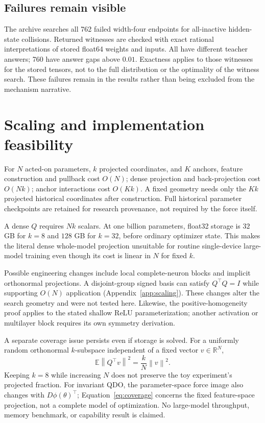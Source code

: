 \documentclass[11pt,letterpaper]{article}
\theoremstyle{remark}\newtheorem{remark}{Remark}
\newcommand{\R}{\mathbb R}
\newcommand{\E}{\mathbb E}
\newcommand{\norm}[1]{\left\lVert#1\right\rVert}
\begin{document}
\subsection{Failures remain visible}
The archive searches all 762 failed width-four endpoints for all-inactive hidden-state collisions. Returned witnesses are checked with exact rational interpretations of stored float64 weights and inputs. All have different teacher answers; 760 have answer gaps above $0.01$. Exactness applies to those witnesses for the stored tensors, not to the full distribution or the optimality of the witness search. These failures remain in the results rather than being excluded from the mechanism narrative.

\section{Scaling and implementation feasibility}\label{sec:scaling}
For $N$ acted-on parameters, $k$ projected coordinates, and $K$ anchors, feature construction and pullback cost $O(N)$; dense projection and back-projection cost $O(Nk)$; anchor interactions cost $O(Kk)$. A fixed geometry needs only the $Kk$ projected historical coordinates after construction. Full historical parameter checkpoints are retained for research provenance, not required by the force itself.

A dense $Q$ requires $Nk$ scalars. At one billion parameters, float32 storage is $32$ GB for $k=8$ and $128$ GB for $k=32$, before ordinary optimizer state. This makes the literal dense whole-model projection unsuitable for routine single-device large-model training even though its cost is linear in $N$ for fixed $k$.

Possible engineering changes include local complete-neuron blocks and implicit orthonormal projections. A disjoint-group signed basis can satisfy $Q^\top Q=I$ while supporting $O(N)$ application (Appendix~\ref{app:scaling}). These changes alter the search geometry and were not tested here. Likewise, the positive-homogeneity proof applies to the stated shallow ReLU parameterization; another activation or multilayer block requires its own symmetry derivation.

A separate coverage issue persists even if storage is solved. For a uniformly random orthonormal $k$-subspace independent of a fixed vector $v\in\R^N$,
\begin{equation}\label{eq:coverage}
\E\norm{Q^\top v}^2=\frac{k}{N}\norm v^2.
\end{equation}
Keeping $k=8$ while increasing $N$ does not preserve the toy experiment's projected fraction. For invariant QDO, the parameter-space force image also changes with $D\phi(\theta)^\top$; Equation~\eqref{eq:coverage} concerns the fixed feature-space projection, not a complete model of optimization. No large-model throughput, memory benchmark, or capability result is claimed.
\end{document}
